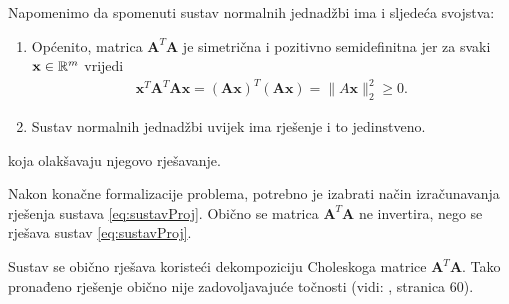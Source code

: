 \documentclass[a4paper,twoside,12pt]{memoir} %
\begin{document}
Napomenimo da spomenuti sustav normalnih jednadžbi ima i sljedeća svojstva:%
\begin{enumerate}
	\item Općenito, matrica $\mathbf{A}^T\mathbf{A}$ je simetrična i pozitivno semidefinitna jer za svaki
	$\mathbf{x} \in \mathbb{R}^m$ vrijedi
	\begin{align}
	\mathbf{x}^T\mathbf{A}^T\mathbf{A}\mathbf{x} = (\mathbf{A}\mathbf{x})^T(\mathbf{A}\mathbf{x}) = \|A\mathbf{x}\|_2^2 \geq 0.
	\end{align}
		\item Sustav normalnih jednadžbi uvijek ima rješenje i to jedinstveno.
\end{enumerate}
koja olakšavaju njegovo rješavanje.
\vspace{1cm}

Nakon konačne formalizacije problema, potrebno je izabrati način izračunavanja rješenja sustava \eqref{eq:sustavProj}.
Obično se matrica $\mathbf{A}^T\mathbf{A}$ ne invertira, nego se rješava sustav \eqref{eq:sustavProj}.

Sustav se obično rješava koristeći dekompoziciju Choleskoga matrice $\mathbf{A}^T\mathbf{A}$.
Tako pronađeno rješenje obično nije zadovoljavajuće točnosti (vidi: \cite{singer07}, stranica 60).
\end{document}
